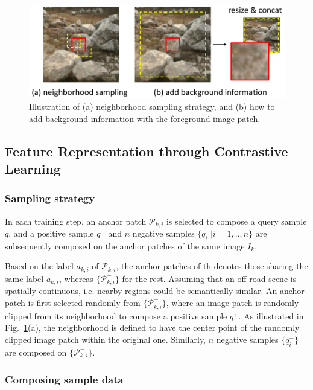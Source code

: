 \documentclass[letterpaper, 10 pt, conference]{ieeeconf}  %
\begin{document}
\begin{figure}[]
	\centering
	\includegraphics[scale=0.235]{dataaug.pdf}
	\caption{Illustration of (a) neighborhood sampling strategy, and (b) how to add background information with the foreground image patch.}
	\label{fig:dataaug}
\end{figure}

\subsection{Feature Representation through Contrastive Learning}

\subsubsection {Sampling strategy}

In each training step, an anchor patch $\mathcal{P}_{k,i}$ is selected to compose a query sample $q$, and a positive sample $q^+$ and $n$ negative samples $\{q^-_i|i=1,..,n\}$ are subsequently composed on the anchor patches of the same image $I_k$.

Based on the label $a_{k,i}$ of $\mathcal{P}_{k,i}$, the anchor patches of th denotes those sharing the same label $a_{k,i}$, whereas $\{\mathcal{P}_{k,i}^-\}$ for the rest.
Assuming that an off-road scene is spatially continuous, i.e. nearby regions could be semantically similar.
An anchor patch is first selected randomly from $\{\mathcal{P}_{k,i}^+\}$, where an image patch is randomly clipped from its neighborhood to compose a positive sample $q^+$. As illustrated in Fig.~\ref{fig:dataaug}(a), the neighborhood is defined to have the center point of the randomly clipped image patch within the original one. Similarly, $n$ negative samples $\{q^-_i\}$ are composed on $\{\mathcal{P}_{k,i}^-\}$.

\subsubsection{Composing sample data}
\end{document}
